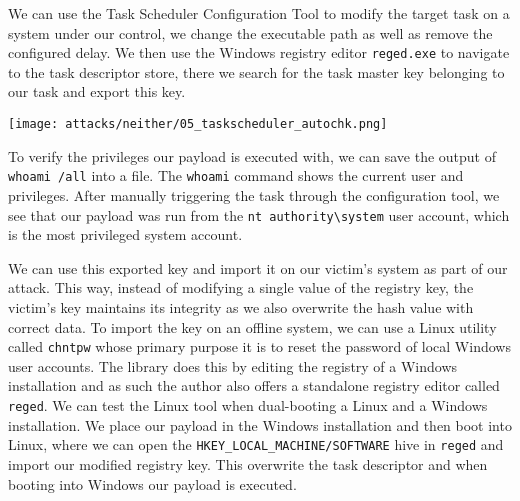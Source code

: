 We can use the Task Scheduler Configuration Tool to modify the target task on a system under our control, we change the executable path as well as remove the configured delay.
We then use the Windows registry editor \lstinline{reged.exe} to navigate to the task descriptor store, there we search for the task master key belonging to our task and export this key.

\texttt{[image: attacks/neither/05\_taskscheduler\_autochk.png]}

To verify the privileges our payload is executed with, we can save the output of \lstinline{whoami /all} into a file.
The \lstinline{whoami} command shows the current user and privileges\cite{microsoft-whoami}.
After manually triggering the task through the configuration tool, we see that our payload was run from the \lstinline{nt authority\system} user account, which is the most privileged system account\cite{microsoft-localsystem-account}.


We can use this exported key and import it on our victim's system as part of our attack.
This way, instead of modifying a single value of the registry key, the victim's key maintains its integrity as we also overwrite the hash value with correct data.
To import the key on an offline system, we can use a Linux utility called \lstinline{chntpw} whose primary purpose it is to reset the password of local Windows user accounts\cite{chntpw}.
The library does this by editing the registry of a Windows installation and as such the author also offers a standalone registry editor called \lstinline{reged}.
We can test the Linux tool when dual-booting a Linux and a Windows installation.
We place our payload in the Windows installation and then boot into Linux, where we can open the \lstinline{HKEY_LOCAL_MACHINE/SOFTWARE} hive in \lstinline{reged} and import our modified registry key.
This overwrite the task descriptor and when booting into Windows our payload is executed.

